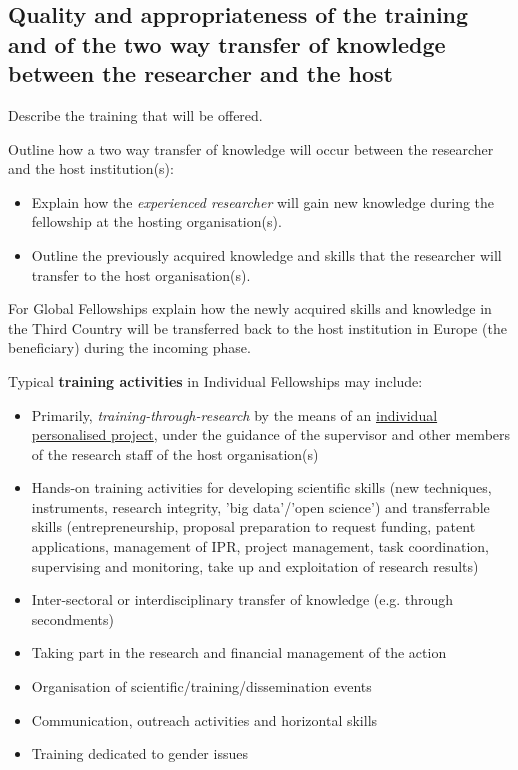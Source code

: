 \subsection{Quality and appropriateness of the training and of the two way transfer of knowledge between the researcher and the host}
\label{sec:excellence_transfer}

Describe the training that will be offered.

\medskip\noindent
Outline how a two way transfer of knowledge will occur between the researcher and the host institution(s):
\begin{itemize}
\item Explain how the \emph{experienced researcher} will gain new knowledge during the fellowship at the hosting organisation(s).
\item Outline the previously acquired knowledge and skills that the researcher will transfer to the host organisation(s).
\end{itemize}

\noindent
For Global Fellowships explain how the newly acquired skills and knowledge in the Third Country will be transferred back to the host institution in Europe (the beneficiary) during the incoming phase.

\medskip\noindent
Typical \textbf{training activities} in Individual Fellowships may include:
\begin{itemize}
\item Primarily, \emph{training-through-research} by the means of an \ul{individual personalised
project}, under the guidance of the supervisor and other members of the research
staff of the host organisation(s)
\item Hands-on training activities for developing scientific skills (new techniques,
instruments, research integrity, 'big data'/'open science') and transferrable skills
(entrepreneurship, proposal preparation to request funding, patent applications,
management of IPR, project management, task coordination, supervising and
monitoring, take up and exploitation of research results)
\item Inter-sectoral or interdisciplinary transfer of knowledge (e.g. through secondments)
\item Taking part in the research and financial management of the action
\item Organisation of scientific/training/dissemination events
\item Communication, outreach activities and horizontal skills
\item Training dedicated to gender issues
\end{itemize}




